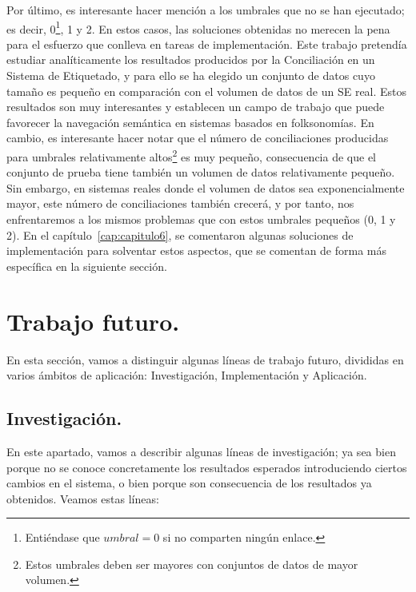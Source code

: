 Por último, es interesante hacer mención a los umbrales que no se han ejecutado; es decir, 0\footnote{Entiéndase que $umbral=0$ si no comparten ningún enlace.}, 1 y 2. En estos casos, las soluciones obtenidas no merecen la pena para el esfuerzo que conlleva en tareas de implementación. Este trabajo pretendía estudiar analíticamente los resultados producidos por la Conciliación en un Sistema de Etiquetado, y para ello se ha elegido un conjunto de datos cuyo tamaño es pequeño en comparación con el volumen de datos de un SE real. Estos resultados son muy interesantes y establecen un campo de trabajo que puede favorecer la navegación semántica en sistemas basados en folksonomías. En cambio, es interesante hacer notar que el número de conciliaciones producidas para umbrales relativamente altos\footnote{Estos umbrales deben ser mayores con conjuntos de datos de mayor volumen.} es muy pequeño, consecuencia de que el conjunto de prueba tiene también un volumen de datos relativamente pequeño. Sin embargo, en sistemas reales donde el volumen de datos sea exponencialmente mayor, este número de conciliaciones también crecerá, y por tanto, nos enfrentaremos a los mismos problemas que con estos umbrales pequeños (0, 1 y 2). En el capítulo~\ref{cap:capitulo6}, se comentaron algunas soluciones de implementación para solventar estos aspectos, que se comentan de forma más específica en la siguiente sección.




\section{Trabajo futuro.}

En esta sección, vamos a distinguir algunas líneas de trabajo futuro, divididas en varios ámbitos de aplicación: Investigación, Implementación y Aplicación.

\subsection{Investigación.}

En este apartado, vamos a describir algunas líneas de investigación; ya sea bien porque no se conoce concretamente los resultados esperados introduciendo ciertos cambios en el sistema, o bien porque son consecuencia de los resultados ya obtenidos. Veamos estas líneas:


